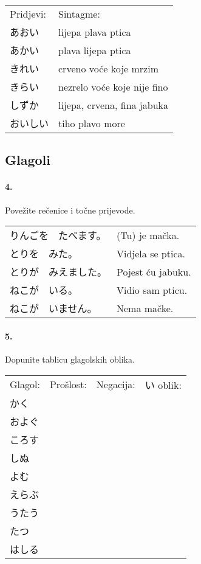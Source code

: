 \documentclass[12pt]{article}
\begin{document}
	\begin{tabularx}{\textwidth}{X X}
		Pridjevi:&Sintagme:\\
		あおい&lijepa plava ptica\\
		あかい&plava lijepa ptica\\
		きれい&crveno voće koje mrzim\\
		きらい&nezrelo voće koje nije fino\\
		しずか&lijepa, crvena, fina jabuka\\
		おいしい&tiho plavo more\\
	\end{tabularx}

	\subsection{Glagoli}
	
	\paragraph{4.} Povežite rečenice i točne prijevode.
	
	\begin{tabularx}{\textwidth}{X X}
		りんごを　たべます。&(Tu) je mačka.\\
		とりを　みた。&Vidjela se ptica.\\
		とりが　みえました。&Pojest ću jabuku.\\
		ねこが　いる。&Vidio sam pticu.\\
		ねこが　いません。&Nema mačke.\\
	\end{tabularx}
	
	\newpage
	\paragraph{5.} Dopunite tablicu glagolskih oblika.
	
	\begin{tabularx}{\textwidth}{X X X X}
		Glagol:&Prošlost:&Negacija:&い oblik:\\
		かく&&&\\
		およぐ&&&\\
		ころす&&&\\
		しぬ&&&\\
		よむ&&&\\
		えらぶ&&&\\
		うたう&&&\\
		たつ&&&\\
		はしる&&&\\
	\end{tabularx}
	
\end{document}
